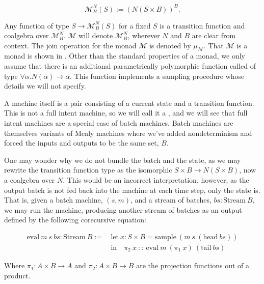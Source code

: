 \begin{equation}\label{eq:M-monad}
    \mathcal{M}_B^N(S) := (N(S\times B))^B.
\end{equation}

Any function of type $S \rightarrow \mathcal{M}_B^N(S)$ for a fixed $S$ is a transition function and coalgebra over $\mathcal{M}_B^N$. $\mathcal{M}$ will denote $\mathcal{M}_B^N$, wherever $N$ and $B$ are clear from context. The join operation for the monad $\mathcal{M}$ is denoted by $\mu_\mathcal{M}$. That $\mathcal{M}$ is a monad is shown
in . Other than the standard properties of a monad, we only assume that there is an additional parametrically polymorphic function \citep{pierce2002types} called  of type $\forall \alpha. N(\alpha) \rightarrow \alpha$. This function implements a sampling procedure whose details we will not specify.

A machine itself is a pair consisting of a current state and a transition function. This is not a full intent machine, so we will call it a , and we will see that full intent machines are a special case of batch machines. Batch machines are themselves variants of Mealy machines \citep{bonsangue2008coalgebraic} where we've added nondeterminism and forced the inputs and outputs to be the same set, $B$.

One may wonder why we do not bundle the batch and the state, as we may rewrite the transition function type as the isomorphic $S \times B \rightarrow N(S \times B)$, now a coalgebra over $N$. This would be an incorrect interpretation, however, as the output batch is not fed back into the machine at each time step, only the state is. That is, given a batch machine, $(s, m)$, and a stream of batches, $bs : \text{Stream}\ B$, we may run the machine, producing another stream of batches as an output defined by the following corecursive equation:

\begin{equation}
\begin{split}
    \text{eval}\ m\ s\ bs : \text{Stream}\ B :=\, &\text{let}\ x : S \times B = \text{sample}\ (m\ s\ (\text{head}\ bs)) \\
    &\text{in}\quad \pi_2\ x\ ::\ \text{eval}\ m\ (\pi_1\ x)\ (\text{tail}\ bs)
\end{split}
\end{equation}

Where $\pi_1 : A \times B \rightarrow A$ and $\pi_2 : A \times B \rightarrow B$ are the projection functions out of a product.

